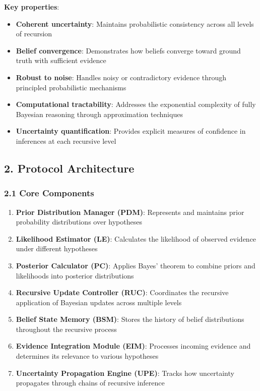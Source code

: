 \documentclass[
]{article}
\providecommand{\tightlist}{%
  \setlength{\itemsep}{0pt}\setlength{\parskip}{0pt}}
\begin{document}
\textbf{Key properties}:

\begin{itemize}
\tightlist
\item
  \textbf{Coherent uncertainty}: Maintains probabilistic consistency
  across all levels of recursion
\item
  \textbf{Belief convergence}: Demonstrates how beliefs converge toward
  ground truth with sufficient evidence
\item
  \textbf{Robust to noise}: Handles noisy or contradictory evidence
  through principled probabilistic mechanisms
\item
  \textbf{Computational tractability}: Addresses the exponential
  complexity of fully Bayesian reasoning through approximation
  techniques
\item
  \textbf{Uncertainty quantification}: Provides explicit measures of
  confidence in inferences at each recursive level
\end{itemize}

\subsection{2. Protocol Architecture}\label{protocol-architecture-1}

\subsubsection{2.1 Core Components}\label{core-components-1}

\begin{enumerate}
\def\labelenumi{\arabic{enumi}.}
\tightlist
\item
  \textbf{Prior Distribution Manager (PDM)}: Represents and maintains
  prior probability distributions over hypotheses
\item
  \textbf{Likelihood Estimator (LE)}: Calculates the likelihood of
  observed evidence under different hypotheses
\item
  \textbf{Posterior Calculator (PC)}: Applies Bayes' theorem to combine
  priors and likelihoods into posterior distributions
\item
  \textbf{Recursive Update Controller (RUC)}: Coordinates the recursive
  application of Bayesian updates across multiple levels
\item
  \textbf{Belief State Memory (BSM)}: Stores the history of belief
  distributions throughout the recursive process
\item
  \textbf{Evidence Integration Module (EIM)}: Processes incoming
  evidence and determines its relevance to various hypotheses
\item
  \textbf{Uncertainty Propagation Engine (UPE)}: Tracks how uncertainty
  propagates through chains of recursive inference
\end{enumerate}
\end{document}
